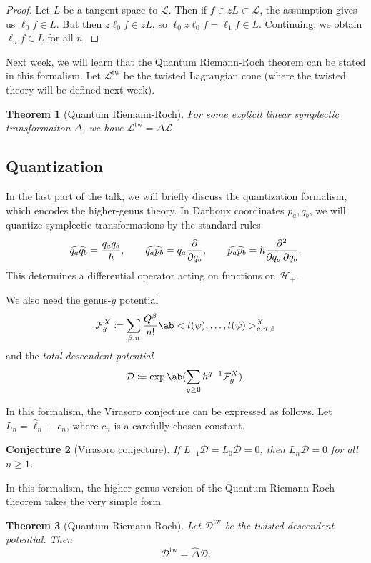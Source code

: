 \documentclass[leqno, openany]{memoir}
\newtheorem{thm}{Theorem}[section]
\newtheorem{conj}[thm]{Conjecture}
\theoremstyle{definition}
\theoremstyle{remark}
\theoremstyle{plain}
\theoremstyle{definition}
\theoremstyle{remark}
\newcommand{\mc}[1]{\mathcal{#1}}
\newcommand{\mr}[1]{\mathrm{#1}}
\newcommand{\wh}[1]{\widehat{#1}}
\begin{document}
\begin{proof}
    Let $L$ be a tangent space to $\mc{L}$. Then if $f \in zL \subset \mc{L}$, the assumption gives us $\ell_0 f \in L$. But then $z \ell_0 f \in zL$, so $\ell_0 z \ell_0 f = \ell_1 f \in L$. Continuing, we obtain $\ell_n f \in L$ for all $n$.
\end{proof}

Next week, we will learn that the Quantum Riemann-Roch theorem can be stated in this formalism. Let $\mc{L}^{\mr{tw}}$ be the twisted Lagrangian cone (where the twisted theory will be defined next week).
\begin{thm}[Quantum Riemann-Roch]
    For some explicit linear symplectic transformaiton $\Delta$, we have $\mc{L}^{\mr{tw}} = \Delta \mc{L}$.
\end{thm}




\subsection{Quantization}

In the last part of the talk, we will briefly discuss the quantization formalism, which encodes the higher-genus theory. In Darboux coordinates $p_a, q_b$, we will quantize symplectic transformations by the standard rules
\[ \wh{{q_a q_b}} = \frac{q_a q_b}{\hslash}, \qquad \wh{q_a p_b} = q_a \pdv{}{q_b}, \qquad \wh{p_a p_b} = \hslash \pdv{}{q_a,q_b}. \]
This determines a differential operator acting on functions on $\mc{H}_+$.

We also need the genus-$g$ potential
\[ \mc{F}_g^X \coloneqq \sum_{\beta, n} \frac{Q^{\beta}}{n!} \ab<t(\psi), \ldots, t(\psi)>_{g,n,\beta}^X \]
and the \textit{total descendent potential}
\[ \mc{D} \coloneqq \exp\ab(\sum_{g \geq 0} \hslash^{g-1} \mc{F}_g^X). \]

In this formalism, the Virasoro conjecture can be expressed as follows. Let $L_n = \wh{\ell}_n + c_n$, where $c_n$ is a carefully chosen constant.

\begin{conj}[Virasoro conjecture]
    If $L_{-1} \mc{D} = L_0 \mc{D} = 0$, then $L_n \mc{D} = 0$ for all $n \geq 1$.
\end{conj}

In this formalism, the higher-genus version of the Quantum Riemann-Roch theorem takes the very simple form
\begin{thm}[Quantum Riemann-Roch]
    Let $\mc{D}^{\mr{tw}}$ be the twisted descendent potential. Then
    \[ \mc{D}^{\mr{tw}} = \wh{\Delta} \mc{D}. \]
\end{thm}
\end{document}
